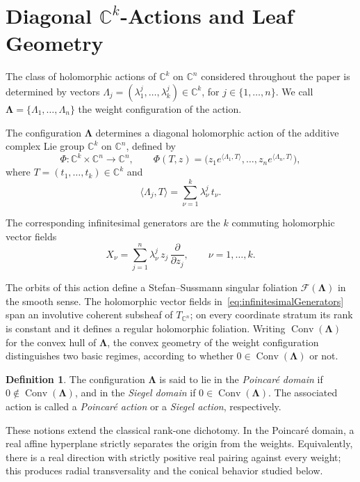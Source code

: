 \documentclass[11pt]{amsart}
\theoremstyle{definition}
\newtheorem{definition}[theorem]{Definition}
\theoremstyle{remark}
\newcommand{\C}{\mathbb{C}}
\newcommand{\Lam}{\pmb{\Lambda}}
\newcommand{\lamkn}[2]{\lambda^{#2}_{#1}}
\newcommand{\convexhull}[1]{ \operatorname{Conv}(#1)}
\begin{document}
\section{Diagonal \texorpdfstring{$\C^k$}{C\string^k}-Actions and Leaf Geometry}\label{sec:preliminaries}

The class of holomorphic actions of $\C^k$ on $\C^n$ considered throughout the paper is determined by vectors $\Lambda_j=(\lamkn{1}{j},\dots,\lamkn{k}{j})\in\C^k$, for $j\in\{1,\ldots,n\}$.
We call $\Lam=\{\Lambda_1,\dots,\Lambda_n\}$ the weight configuration of the action.

The configuration $\Lam$ determines a diagonal holomorphic action of the additive complex Lie group $\C^k$ on $\C^n$, defined by
\[
	\Phi:\C^k\times\C^n\longrightarrow\C^n, \qquad \Phi(T,z)= \bigl( z_1e^{\langle\Lambda_1,T\rangle}, \dots, z_ne^{\langle\Lambda_n,T\rangle} \bigr),
\]
where $T=(t_1,\dots,t_k)\in\C^k$ and
\[
	\langle\Lambda_j,T\rangle = \sum_{\nu=1}^k \lamkn{\nu}{j} \, t_\nu .
\]

The corresponding infinitesimal generators are the $k$ commuting holomorphic vector fields
\begin{equation} \label{eq:infinitesimalGenerators}
	X_\nu=\sum_{j=1}^n \lamkn{\nu}{j} \, z_j \, \frac{\partial}{\partial z_j}, \qquad \nu=1,\dots,k.
\end{equation}

The orbits of this action define a Stefan--Sussmann singular foliation $\mathcal F(\Lam)$ in the smooth sense.
The holomorphic vector fields in~\eqref{eq:infinitesimalGenerators} span an involutive coherent subsheaf of $T_{\C^n}$; on every coordinate stratum its rank is constant and it defines a regular holomorphic foliation.
Writing $\convexhull{\Lam}$ for the convex hull of $\Lam$, the convex geometry of the weight configuration distinguishes two basic regimes, according to whether $0\in\convexhull{\Lam}$ or not.

\begin{definition}
	The configuration $\Lam$ is said to lie in the \emph{Poincaré domain} if $0 \notin \convexhull{\Lam}$, and in the \emph{Siegel domain} if $0 \in \convexhull{\Lam}$.
	The associated action is called a \emph{Poincaré action} or a \emph{Siegel action}, respectively.
\end{definition}

These notions extend the classical rank-one dichotomy.
In the Poincaré domain, a real affine hyperplane strictly separates the origin from the weights.
Equivalently, there is a real direction with strictly positive real pairing against every weight; this produces radial transversality and the conical behavior studied below.
\end{document}
